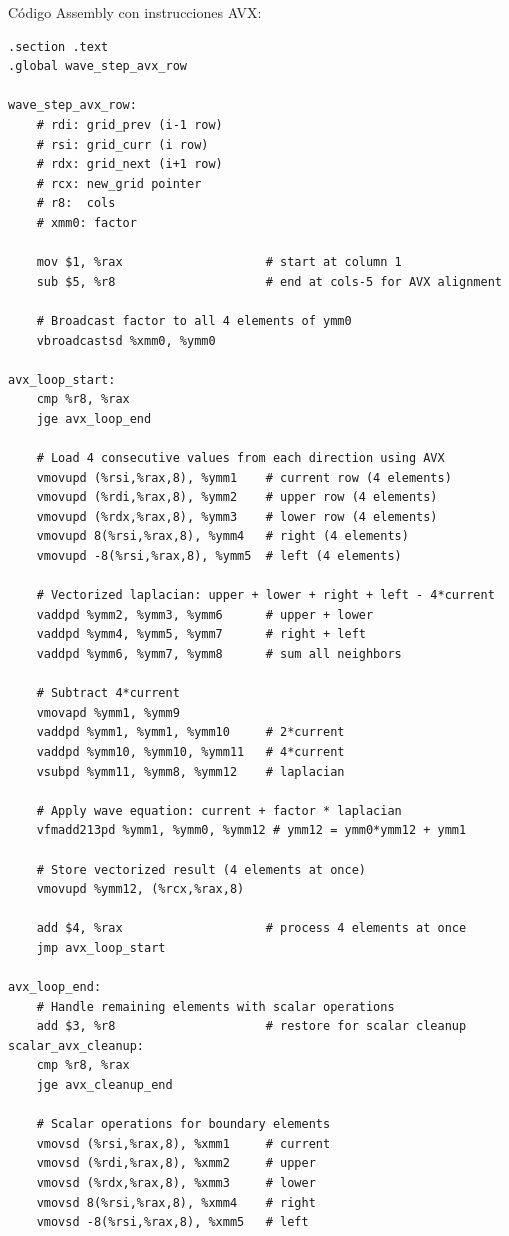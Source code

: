 \documentclass[a4paper]{article}
\begin{document}
Código Assembly con instrucciones AVX:
\begin{verbatim}
.section .text
.global wave_step_avx_row

wave_step_avx_row:
    # rdi: grid_prev (i-1 row)
    # rsi: grid_curr (i row)  
    # rdx: grid_next (i+1 row)
    # rcx: new_grid pointer
    # r8:  cols
    # xmm0: factor
    
    mov $1, %rax                    # start at column 1
    sub $5, %r8                     # end at cols-5 for AVX alignment
    
    # Broadcast factor to all 4 elements of ymm0
    vbroadcastsd %xmm0, %ymm0
    
avx_loop_start:
    cmp %r8, %rax
    jge avx_loop_end
    
    # Load 4 consecutive values from each direction using AVX
    vmovupd (%rsi,%rax,8), %ymm1    # current row (4 elements)
    vmovupd (%rdi,%rax,8), %ymm2    # upper row (4 elements)
    vmovupd (%rdx,%rax,8), %ymm3    # lower row (4 elements)
    vmovupd 8(%rsi,%rax,8), %ymm4   # right (4 elements)
    vmovupd -8(%rsi,%rax,8), %ymm5  # left (4 elements)
    
    # Vectorized laplacian: upper + lower + right + left - 4*current
    vaddpd %ymm2, %ymm3, %ymm6      # upper + lower
    vaddpd %ymm4, %ymm5, %ymm7      # right + left  
    vaddpd %ymm6, %ymm7, %ymm8      # sum all neighbors
    
    # Subtract 4*current
    vmovapd %ymm1, %ymm9
    vaddpd %ymm1, %ymm1, %ymm10     # 2*current
    vaddpd %ymm10, %ymm10, %ymm11   # 4*current
    vsubpd %ymm11, %ymm8, %ymm12    # laplacian
    
    # Apply wave equation: current + factor * laplacian
    vfmadd213pd %ymm1, %ymm0, %ymm12 # ymm12 = ymm0*ymm12 + ymm1
    
    # Store vectorized result (4 elements at once)
    vmovupd %ymm12, (%rcx,%rax,8)
    
    add $4, %rax                    # process 4 elements at once
    jmp avx_loop_start
    
avx_loop_end:
    # Handle remaining elements with scalar operations
    add $3, %r8                     # restore for scalar cleanup
scalar_avx_cleanup:
    cmp %r8, %rax
    jge avx_cleanup_end
    
    # Scalar operations for boundary elements
    vmovsd (%rsi,%rax,8), %xmm1     # current
    vmovsd (%rdi,%rax,8), %xmm2     # upper
    vmovsd (%rdx,%rax,8), %xmm3     # lower
    vmovsd 8(%rsi,%rax,8), %xmm4    # right
    vmovsd -8(%rsi,%rax,8), %xmm5   # left
    

\end{verbatim}
\end{document}
